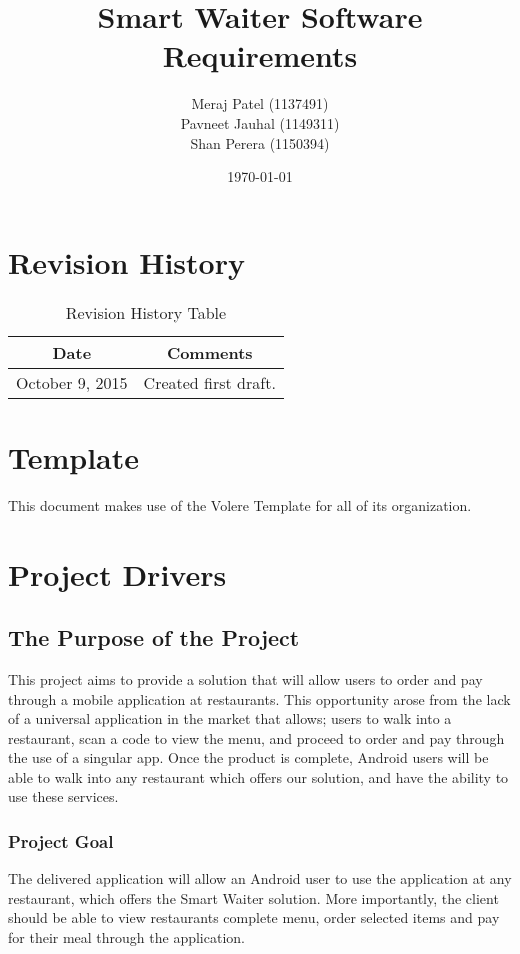 \documentclass[12pt, titlepage]{article}
\begin{document}
\title{Smart Waiter Software Requirements} 
\author{Meraj Patel (1137491)\\ Pavneet Jauhal (1149311)\\ Shan Perera (1150394)}
\date{\today}
\maketitle

\tableofcontents 

\listoffigures

\listoftables

\begin{table}[H]
\section*{Revision History}
\begin{tabular}{|c|c|}
\hline
\textbf{Date}  & \textbf{Comments} \\ \hline
October 9, 2015 & Created first draft. \\ 
\hline
\end{tabular}
\caption{Revision History Table}
\end{table}

\section*{Template}
This document makes use of the Volere Template for all of its organization.
\pagebreak

\section{Project Drivers}

\subsection{The Purpose of the Project}
This project aims to provide a solution that will allow users to order and pay through a mobile application at restaurants. This opportunity arose from the lack of a universal application in the market that allows; users to walk into a restaurant, scan a code to view the menu, and proceed to order and pay through the use of a singular app. Once the product is complete, Android users will be able to walk into any restaurant which offers our solution, and have the ability to use these services.
\subsubsection{Project Goal}
The delivered application will allow an Android user to use the application at any restaurant, which offers the Smart Waiter solution.  More importantly, the client should be able to view restaurants complete menu, order selected items and pay for their meal through the application. 
\end{document}
